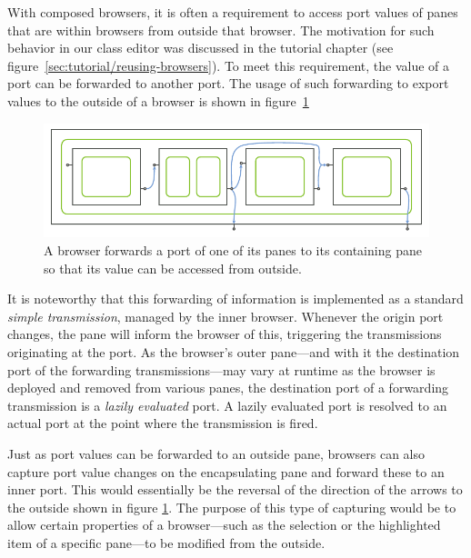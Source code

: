 \documentclass[a4paper,10pt,twoside]{book}
\begin{document}
With composed browsers, it is often a requirement to access port values of panes that are within browsers from outside that browser. The motivation for such behavior in our class editor was discussed in the tutorial chapter (see figure~\ref{sec:tutorial/reusing-browsers}). To meet this requirement, the value of a port can be forwarded to another port. The usage of such forwarding to export values to the outside of a browser is shown in figure~\ref{fig:abs-port_publishing}

\begin{figure}[htbp]
\centerline{\includegraphics[width=\linewidth]{portpublishing.pdf}}
\caption{A browser forwards a port of one of its panes to its containing pane so that its value can be accessed from outside.}
\label{fig:abs-port_publishing}
\end{figure}

It is noteworthy that this forwarding of information is implemented as a standard \emph{simple transmission}, managed by the inner browser. Whenever the origin port changes, the pane will inform the browser of this, triggering the transmissions originating at the port. As the browser's outer pane---and with it the destination port of the forwarding transmissions---may vary at runtime as the browser is deployed and removed from various panes, the destination port of a forwarding transmission is a \emph{lazily evaluated} port. A lazily evaluated port is resolved to an actual port at the point where the transmission is fired.

Just as port values can be forwarded to an outside pane, browsers can also capture port value changes on the encapsulating pane and forward these to an inner port. This would essentially be the reversal of the direction of the arrows to the outside shown in figure \ref{fig:abs-port_publishing}. The purpose of this type of capturing would be to allow certain properties of a browser---such as the selection or the highlighted item of a specific pane---to be modified from the outside.



\end{document}

